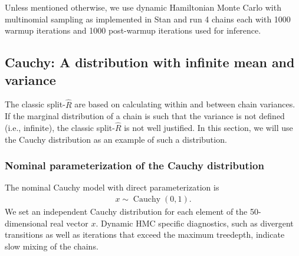 \documentclass[american,]{article}
\DeclareMathOperator{\Cauchy}{Cauchy}
\theoremstyle{definition}
\begin{document}
Unless mentioned otherwise, we use dynamic Hamiltonian Monte Carlo with
multinomial sampling \citep{betancourt2017conceptual} as implemented
in Stan \citep{StanManual.2.18.0} and run 4 chains each with 1000
warmup iterations and 1000 post-warmup iterations used for inference.

\hypertarget{cauchy-a-distribution-with-infinite-mean-and-variance}{%
\subsection{Cauchy: A distribution with infinite mean and
variance}\label{cauchy-a-distribution-with-infinite-mean-and-variance}}

The classic split-\(\widehat{R}\) are based on calculating
within and between chain variances. If the marginal distribution of a
chain is such that the variance is not defined (i.e., infinite), the
classic split-\(\widehat{R}\) is not well justified. In this
section, we will use the Cauchy distribution as an example of such a
distribution. 

\hypertarget{nominal-parameterization-of-the-cauchy-distribution}{%
\subsubsection*{Nominal parameterization of the
Cauchy distribution}\label{nominal-parameterization-of-the-cauchy-distribution}}

The nominal Cauchy model with direct parameterization is
\begin{align}
  x \sim \Cauchy(0,1).
\end{align}
We set an independent Cauchy distribution for each element of the 50-dimensional 
real vector $x$. Dynamic HMC specific diagnostics, such as divergent
transitions as well as iterations that exceed the maximum treedepth,
indicate slow mixing of the chains.

\end{document}
